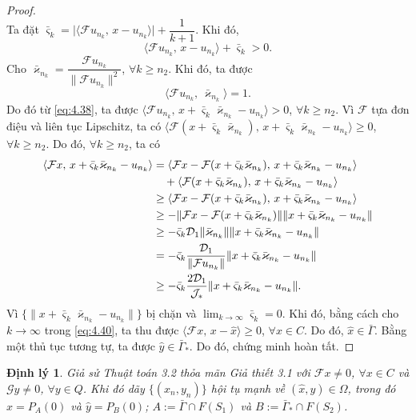 \documentclass{MyBook}
\theoremstyle{plain}
\newtheorem{theorem}{Định lý}[chapter]
\theoremstyle{definition}
\theoremstyle{remark}
\numberwithin{equation}{chapter}
\newcommand{\Fc}{\mathcal{F}}
\newcommand{\Gc}{\mathcal{G}}
\newcommand{\Dc}{\mathcal{D}}
\newcommand{\inp}[2]{\langle #1,\,#2\rangle}
\newcommand{\nm}[1]{\lVert #1\rVert}
\newcommand{\abs}[1]{\lvert #1\rvert}
\newcommand{\Gam}{\bar{\Gamma}}
\newcommand{\Gams}{\bar{\Gamma}_{*}}
\newcommand{\Fix}[1]{F(#1)}
\begin{document}
\begin{proof}
\[\]
Ta đặt $\bar{\varsigma}_k=\abs{\inp{\Fc u_{n_k}}{x-u_{n_k}}}+\dfrac{1}{k+1}$. Khi đó,
\begin{equation}
\inp{\Fc u_{n_k}}{x-u_{n_k}}+\bar{\varsigma}_k>0. \label{eq:4.38}
\end{equation}
Cho $\bar{\varkappa}_{n_k}=\dfrac{\Fc u_{n_k}}{\nm{\Fc u_{n_k}}^2}$, $\forall k\ge n_2$. Khi đó, ta được
\begin{equation}
\inp{\Fc u_{n_k}}{\bar{\varkappa}_{n_k}}=1. \label{eq:4.39}
\end{equation}
Do đó từ \eqref{eq:4.38}, ta được $\inp{\Fc u_{n_k}}{x+\bar{\varsigma}_k\bar{\varkappa}_{n_k}-u_{n_k}}>0$, $\forall k\ge n_2$. Vì $\Fc$ tựa đơn điệu và liên tục Lipschitz, ta có $\inp{\Fc(x+\bar{\varsigma}_k\bar{\varkappa}_{n_k})}{x+\bar{\varsigma}_k\bar{\varkappa}_{n_k}-u_{n_k}}\ge 0$, $\forall k\ge n_2$. Do đó, $\forall k\ge n_2$, ta có
\begin{align}
\inp{\Fc x}{x+\bar{\varsigma}_k\bar{\varkappa}_{n_k}-u_{n_k}} &= \inp{\Fc x-\Fc(x+\bar{\varsigma}_k\bar{\varkappa}_{n_k})}{x+\bar{\varsigma}_k\bar{\varkappa}_{n_k}-u_{n_k}}\notag\\
&\quad +\inp{\Fc(x+\bar{\varsigma}_k\bar{\varkappa}_{n_k})}{x+\bar{\varsigma}_k\bar{\varkappa}_{n_k}-u_{n_k}}\notag\\
&\ge \inp{\Fc x-\Fc(x+\bar{\varsigma}_k\bar{\varkappa}_{n_k})}{x+\bar{\varsigma}_k\bar{\varkappa}_{n_k}-u_{n_k}}\notag\\
&\ge -\nm{\Fc x-\Fc(x+\bar{\varsigma}_k\bar{\varkappa}_{n_k})}\nm{x+\bar{\varsigma}_k\bar{\varkappa}_{n_k}-u_{n_k}}\notag\\
&\ge -\bar{\varsigma}_k\Dc_1\nm{\bar{\varkappa}_{n_k}}\nm{x+\bar{\varsigma}_k\bar{\varkappa}_{n_k}-u_{n_k}}\notag\\
&= -\bar{\varsigma}_k\frac{\Dc_1}{\nm{\Fc u_{n_k}}}\nm{x+\bar{\varsigma}_k\bar{\varkappa}_{n_k}-u_{n_k}}\notag\\
&\ge -\bar{\varsigma}_k\frac{2\Dc_1}{\mathcal{J}_{*}}\nm{x+\bar{\varsigma}_k\bar{\varkappa}_{n_k}-u_{n_k}}. \label{eq:4.40}
\end{align}
Vì $\{\nm{x+\bar{\varsigma}_k\bar{\varkappa}_{n_k}-u_{n_k}}\}$ bị chặn và $\lim_{k\to\infty}\bar{\varsigma}_k=0$. Khi đó, bằng cách cho $k\to\infty$ trong \eqref{eq:4.40}, ta thu được $\inp{\Fc x}{x-\hat{x}}\ge 0$, $\forall x\in C$. Do đó, $\hat{x}\in\Gam$. Bằng một thủ tục tương tự, ta được $\hat{y}\in\Gams$. Do đó, chứng minh hoàn tất.
\end{proof}

\begin{theorem}\label{thm:4.8}
Giả sử Thuật toán 3.2 thỏa mãn Giả thiết 3.1 với $\Fc x\ne 0$, $\forall x\in C$ và $\Gc y\ne 0$, $\forall y\in Q$. Khi đó dãy $\{(x_n,y_n)\}$ hội tụ mạnh về $(\hat{x},\hat{y})\in\Omega$, trong đó $\hat{x}=P_A(0)$ và $\hat{y}=P_B(0)$; $A:=\Gam\cap \Fix{S_1}$ và $B:=\Gams\cap \Fix{S_2}$.
\end{theorem}
\end{document}
